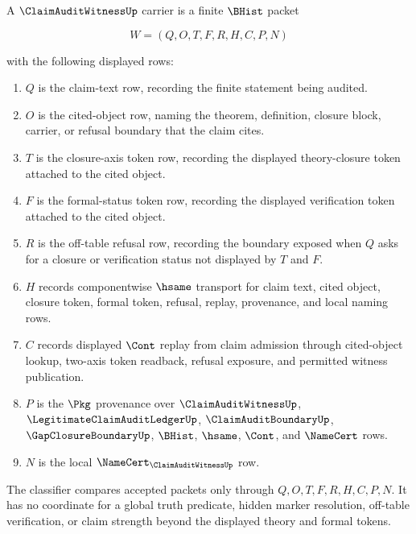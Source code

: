 \begin{definition}
\label{def:claim-audit-witness-carrier}
A $\ClaimAuditWitnessUp$ carrier is a finite $\BHist$ packet

$$
W=(Q,O,T,F,R,H,C,P,N)
$$

with the following displayed rows:
\begin{enumerate}
\item $Q$ is the claim-text row, recording the finite statement being audited.
\item $O$ is the cited-object row, naming the theorem, definition, closure block, carrier, or refusal boundary that the claim cites.
\item $T$ is the closure-axis token row, recording the displayed theory-closure token attached to the cited object.
\item $F$ is the formal-status token row, recording the displayed verification token attached to the cited object.
\item $R$ is the off-table refusal row, recording the boundary exposed when $Q$ asks for a closure or verification status not displayed by $T$ and $F$.
\item $H$ records componentwise $\hsame$ transport for claim text, cited object, closure token, formal token, refusal, replay, provenance, and local naming rows.
\item $C$ records displayed $\Cont$ replay from claim admission through cited-object lookup, two-axis token readback, refusal exposure, and permitted witness publication.
\item $P$ is the $\Pkg$ provenance over $\ClaimAuditWitnessUp$, $\LegitimateClaimAuditLedgerUp$, $\ClaimAuditBoundaryUp$, $\GapClosureBoundaryUp$, $\BHist$, $\hsame$, $\Cont$, and $\NameCert$ rows.
\item $N$ is the local $\NameCert_{\ClaimAuditWitnessUp}$ row.
\end{enumerate}
The classifier compares accepted packets only through $Q,O,T,F,R,H,C,P,N$. It has no coordinate for a global truth predicate, hidden marker resolution, off-table verification, or claim strength beyond the displayed theory and formal tokens.
\end{definition}

